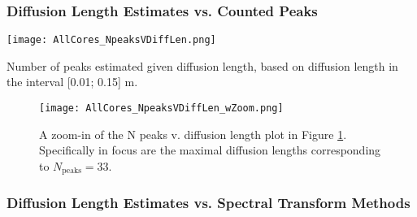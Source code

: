 \documentclass[../../CompleteThesis2/Complete_2ndDraft]{subfiles}
\begin{document}
\subsubsection[Diffusion Length V N Peaks]{Diffusion Length Estimates vs. Counted Peaks}
\label{Subsubsec:Results_DiffLenEst_AlphabetCores_DiffLenVPeaks}
\begin{marginfigure}
	\centering
	\texttt{[image: AllCores\_NpeaksVDiffLen.png]}
	\caption[$\sigma$ vs. N Peaks]{\footnotesize Number of peaks estimated given diffusion length, based on diffusion length in the interval [0.01; 0.15] m.}
	\label{fig:AllCores_NpeaksVDiffLen}
\end{marginfigure}

\begin{figure}[h]
	\centering
	\texttt{[image: AllCores\_NpeaksVDiffLen\_wZoom.png]}
	\caption[$\sigma$ vs. N Peaks]{\small A zoom-in of the N peaks v. diffusion length plot in Figure \ref{fig:AllCores_NpeaksVDiffLen}. Specifically in focus are the maximal diffusion lengths corresponding to $N_{\text{peaks}}=33$.}
	\label{fig:AllCores_NpeaksVDiffLen}
\end{figure}


\subsubsection[$\sigma$ v. Spectral Transforms]{Diffusion Length Estimates vs. Spectral Transform Methods}
\label{Subsubsec:Results_DiffLenEst_AlphabetCores_SpectralTransforms}
\end{document}
